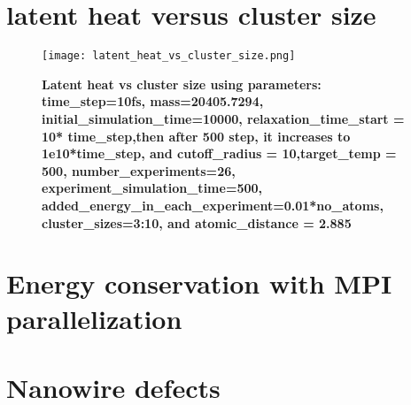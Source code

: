 \section{latent heat versus cluster size}
\graphicspath{ {./figures/milestone07/} }
\begin{figure}[!htb]
\centering
    \texttt{[image: latent\_heat\_vs\_cluster\_size.png]}
    \caption[Latent heat vs cluster size]{\textbf{Latent heat vs cluster size using parameters: time\_step=10fs, mass=20405.7294, initial\_simulation\_time=10000, relaxation\_time\_start = 10* time\_step,then after 500 step, it increases to 1e10*time\_step, and cutoff\_radius = 10,target\_temp = 500, number\_experiments=26, experiment\_simulation\_time=500, added\_energy\_in\_each\_experiment=0.01*no\_atoms, cluster\_sizes=3:10, and atomic\_distance = 2.885}}
\label{fig:latent_heat_vs_cluster_size}
\end{figure}


\section{Energy conservation with MPI parallelization}
\section{Nanowire defects}